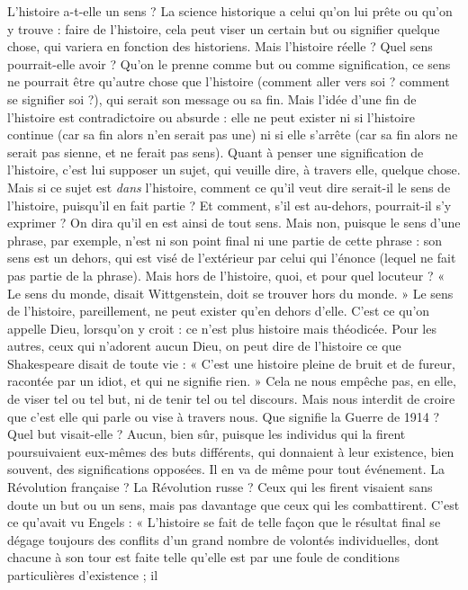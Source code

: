 L’histoire a-t-elle un sens ? La science historique a celui qu’on lui prête ou
qu'on y trouve : faire de l’histoire, cela peut viser un certain but ou signifier
quelque chose, qui variera en fonction des historiens. Mais l’histoire réelle ?
Quel sens pourrait-elle avoir ? Qu’on le prenne comme but ou comme signification,
ce sens ne pourrait être qu'autre chose que l’histoire (comment aller
vers soi ? comment se signifier soi ?), qui serait son message ou sa fin. Mais
l’idée d’une fin de l’histoire est contradictoire ou absurde : elle ne peut exister
ni si l’histoire continue (car sa fin alors n’en serait pas une) ni si elle s’arrête (car
sa fin alors ne serait pas sienne, et ne ferait pas sens). Quant à penser une signification
de l’histoire, c’est lui supposer un sujet, qui veuille dire, à travers elle,
quelque chose. Mais si ce sujet est {\it dans} l'histoire, comment ce qu’il veut dire
serait-il le sens de l’histoire, puisqu'il en fait partie ? Et comment, s’il est au-dehors,
pourrait-il s'y exprimer ? On dira qu’il en est ainsi de tout sens. Mais
non, puisque le sens d’une phrase, par exemple, n’est ni son point final ni une
partie de cette phrase : son sens est un dehors, qui est visé de l’extérieur par
celui qui l’énonce (lequel ne fait pas partie de la phrase). Mais hors de l’histoire,
quoi, et pour quel locuteur ? « Le sens du monde, disait Wittgenstein, doit se
trouver hors du monde. » Le sens de l’histoire, pareillement, ne peut exister
qu’en dehors d’elle. C’est ce qu’on appelle Dieu, lorsqu'on y croit : ce n’est plus
histoire mais théodicée. Pour les autres, ceux qui n’adorent aucun Dieu, on
peut dire de l’histoire ce que Shakespeare disait de toute vie : « C’est une histoire
pleine de bruit et de fureur, racontée par un idiot, et qui ne signifie rien. »
Cela ne nous empêche pas, en elle, de viser tel ou tel but, ni de tenir tel ou tel
discours. Mais nous interdit de croire que c’est elle qui parle ou vise à travers
nous. Que signifie la Guerre de 1914 ? Quel but visait-elle ? Aucun, bien sûr,
puisque les individus qui la firent poursuivaient eux-mêmes des buts différents,
qui donnaient à leur existence, bien souvent, des significations opposées. Il en
va de même pour tout événement. La Révolution française ? La Révolution
russe ? Ceux qui les firent visaient sans doute un but ou un sens, mais pas
davantage que ceux qui les combattirent. C’est ce qu'avait vu Engels :
« L'histoire se fait de telle façon que le résultat final se dégage toujours des
conflits d’un grand nombre de volontés individuelles, dont chacune à son tour
est faite telle qu’elle est par une foule de conditions particulières d’existence ; il
